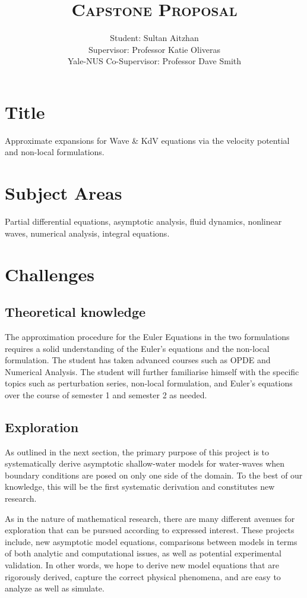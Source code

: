 \documentclass[10pt, oneside, a4paper]{article}
\author{
    Student: Sultan Aitzhan\\
    Supervisor: Professor Katie Oliveras\\
    Yale-NUS Co-Supervisor: Professor Dave Smith
    }
\title{\textsc{Capstone Proposal}}
\date{\vspace{-5ex}}
\begin{document}
\maketitle

\thispagestyle{fancy}


\section{Title}
Approximate expansions for Wave \& KdV equations via the velocity potential and non-local formulations.

\section{Subject Areas}
Partial differential equations, asymptotic analysis, fluid dynamics, nonlinear waves, numerical analysis, integral equations.

\section{Challenges}
\subsection{Theoretical knowledge}
The approximation procedure for the Euler Equations in the two formulations requires a solid understanding of the Euler's equations and the non-local formulation. The student has taken advanced courses such as OPDE and Numerical Analysis. The student will further familiarise himself with the specific topics such as perturbation series, non-local formulation, and Euler's equations over the course of semester 1 and semester 2 as needed.

\subsection{Exploration}
As outlined in the next section, the primary purpose of this project is to systematically derive asymptotic shallow-water models for water-waves when boundary conditions are posed on only one side of the domain.  To the best of our knowledge, this will be the first systematic derivation and constitutes new research. 

As in the nature of mathematical research, there are many different avenues for exploration that can be pursued according to expressed interest.  These projects include, new asymptotic model equations, comparisons between models in terms of both analytic and computational issues, as well as potential experimental validation. In other words, we hope to derive new model equations that are rigorously derived, capture the correct physical phenomena, and are easy to analyze as well as simulate.
\end{document}

